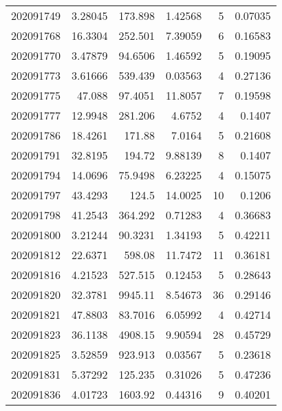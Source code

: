 \begin{tabular}{rrrrrr}
 202091749 &          3.28045 &      173.898  &            1.42568 &           5 & 0.07035 \\
 202091768 &         16.3304  &      252.501  &            7.39059 &           6 & 0.16583 \\
 202091770 &          3.47879 &       94.6506 &            1.46592 &           5 & 0.19095 \\
 202091773 &          3.61666 &      539.439  &            0.03563 &           4 & 0.27136 \\
 202091775 &         47.088   &       97.4051 &           11.8057  &           7 & 0.19598 \\
 202091777 &         12.9948  &      281.206  &            4.6752  &           4 & 0.1407  \\
 202091786 &         18.4261  &      171.88   &            7.0164  &           5 & 0.21608 \\
 202091791 &         32.8195  &      194.72   &            9.88139 &           8 & 0.1407  \\
 202091794 &         14.0696  &       75.9498 &            6.23225 &           4 & 0.15075 \\
 202091797 &         43.4293  &      124.5    &           14.0025  &          10 & 0.1206  \\
 202091798 &         41.2543  &      364.292  &            0.71283 &           4 & 0.36683 \\
 202091800 &          3.21244 &       90.3231 &            1.34193 &           5 & 0.42211 \\
 202091812 &         22.6371  &      598.08   &           11.7472  &          11 & 0.36181 \\
 202091816 &          4.21523 &      527.515  &            0.12453 &           5 & 0.28643 \\
 202091820 &         32.3781  &     9945.11   &            8.54673 &          36 & 0.29146 \\
 202091821 &         47.8803  &       83.7016 &            6.05992 &           4 & 0.42714 \\
 202091823 &         36.1138  &     4908.15   &            9.90594 &          28 & 0.45729 \\
 202091825 &          3.52859 &      923.913  &            0.03567 &           5 & 0.23618 \\
 202091831 &          5.37292 &      125.235  &            0.31026 &           5 & 0.47236 \\
 202091836 &          4.01723 &     1603.92   &            0.44316 &           9 & 0.40201 \\

\end{tabular}
